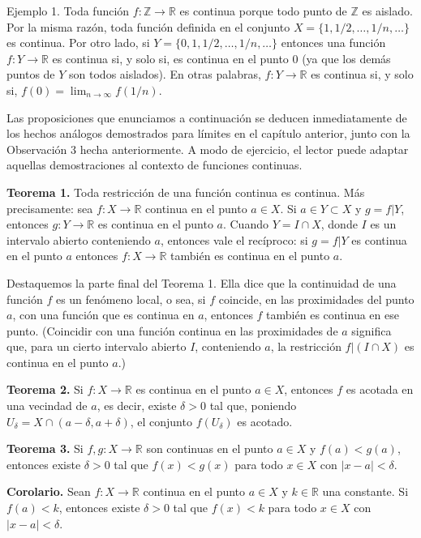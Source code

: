 \documentclass[12pt,oneside]{book}
\begin{document}
Ejemplo 1. Toda función \(f: \mathbb{Z} \to \mathbb{R}\) es continua porque todo punto de \(\mathbb{Z}\) es aislado. Por la misma razón, toda función definida en el conjunto \(X = \{1, 1/2, \dots, 1/n, \dots\}\) es continua. Por otro lado, si \(Y = \{0, 1, 1/2, \dots, 1/n, \dots\}\) entonces una función \(f: Y \to \mathbb{R}\) es continua si, y solo si, es continua en el punto \(0\) (ya que los demás puntos de \(Y\) son todos aislados). En otras palabras, \(f: Y \to \mathbb{R}\) es continua si, y solo si, \(f(0) = \lim_{n \to \infty} f(1/n)\).

Las proposiciones que enunciamos a continuación se deducen inmediatamente de los hechos análogos demostrados para límites en el capítulo anterior, junto con la Observación 3 hecha anteriormente. A modo de ejercicio, el lector puede adaptar aquellas demostraciones al contexto de funciones continuas.

\textbf{Teorema 1.} Toda restricción de una función continua es continua. Más precisamente: sea \(f: X \to \mathbb{R}\) continua en el punto \(a \in X\). Si \(a \in Y \subset X\) y \(g = f|Y\), entonces \(g: Y \to \mathbb{R}\) es continua en el punto \(a\). Cuando \(Y = I \cap X\), donde \(I\) es un intervalo abierto conteniendo \(a\), entonces vale el recíproco: si \(g = f|Y\) es continua en el punto \(a\) entonces \(f: X \to \mathbb{R}\) también es continua en el punto \(a\).

Destaquemos la parte final del Teorema 1. Ella dice que la continuidad de una función \(f\) es un fenómeno local, o sea, si \(f\) coincide, en las proximidades del punto \(a\), con una función que es continua en \(a\), entonces \(f\) también es continua en ese punto. (Coincidir con una función continua en las proximidades de \(a\) significa que, para un cierto intervalo abierto \(I\), conteniendo \(a\), la restricción \(f|(I \cap X)\) es continua en el punto \(a\).)

\textbf{Teorema 2.} Si \(f: X \to \mathbb{R}\) es continua en el punto \(a \in X\), entonces \(f\) es acotada en una vecindad de \(a\), es decir, existe \(\delta > 0\) tal que, poniendo \(U_\delta = X \cap (a - \delta, a + \delta)\), el conjunto \(f(U_\delta)\) es acotado.

\textbf{Teorema 3.} Si \(f, g: X \to \mathbb{R}\) son continuas en el punto \(a \in X\) y \(f(a) < g(a)\), entonces existe \(\delta > 0\) tal que \(f(x) < g(x)\) para todo \(x \in X\) con \(|x - a| < \delta\).

\textbf{Corolario.} Sean \(f: X \to \mathbb{R}\) continua en el punto \(a \in X\) y \(k \in \mathbb{R}\) una constante. Si \(f(a) < k\), entonces existe \(\delta > 0\) tal que \(f(x) < k\) para todo \(x \in X\) con \(|x - a| < \delta\).
\end{document}
